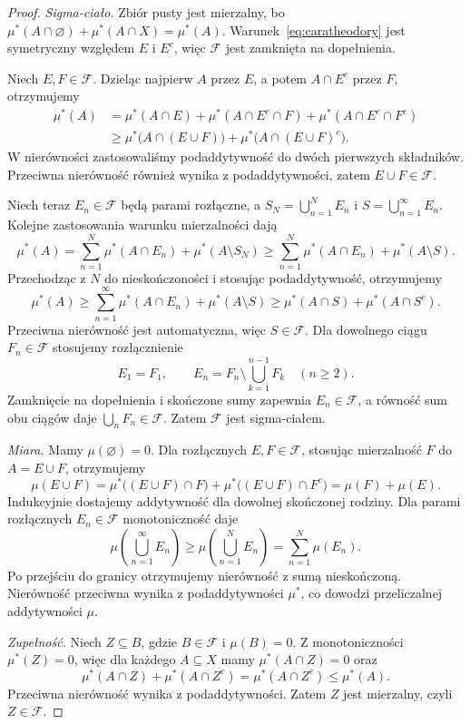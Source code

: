\begin{proof}
\emph{Sigma-ciało.}
Zbiór pusty jest mierzalny, bo
$\mu^{\ast}(A\cap\varnothing)+\mu^{\ast}(A\cap X)=\mu^{\ast}(A)$.
Warunek~\eqref{eq:caratheodory} jest symetryczny względem $E$ i $E^c$,
więc $\mathcal{F}$ jest zamknięta na dopełnienia.

Niech $E,F\in\mathcal{F}$. Dzieląc najpierw $A$ przez $E$, a potem
$A\cap E^c$ przez $F$, otrzymujemy
\begin{align*}
  \mu^{\ast}(A)
    &=\mu^{\ast}(A\cap E)+\mu^{\ast}(A\cap E^c\cap F)
      +\mu^{\ast}(A\cap E^c\cap F^c)\\
    &\geq\mu^{\ast}\bigl(A\cap(E\cup F)\bigr)
      +\mu^{\ast}\bigl(A\cap(E\cup F)^c\bigr).
\end{align*}
W nierówności zastosowaliśmy podaddytywność do dwóch pierwszych
składników. Przeciwna nierówność również wynika z podaddytywności,
zatem $E\cup F\in\mathcal{F}$.

Niech teraz $E_n\in\mathcal{F}$ będą parami rozłączne, a
$S_N=\bigcup_{n=1}^{N}E_n$ i $S=\bigcup_{n=1}^{\infty}E_n$.
Kolejne zastosowania warunku mierzalności dają
\[
  \mu^{\ast}(A)
  =\sum_{n=1}^{N}\mu^{\ast}(A\cap E_n)+\mu^{\ast}(A\setminus S_N)
  \geq\sum_{n=1}^{N}\mu^{\ast}(A\cap E_n)
      +\mu^{\ast}(A\setminus S).
\]
Przechodząc z $N$ do nieskończoności i stosując podaddytywność,
otrzymujemy
\[
  \mu^{\ast}(A)
  \geq\sum_{n=1}^{\infty}\mu^{\ast}(A\cap E_n)
       +\mu^{\ast}(A\setminus S)
  \geq\mu^{\ast}(A\cap S)+\mu^{\ast}(A\cap S^c).
\]
Przeciwna nierówność jest automatyczna, więc $S\in\mathcal{F}$.
Dla dowolnego ciągu $F_n\in\mathcal{F}$ stosujemy rozłącznienie
\[
  E_1=F_1,\qquad
  E_n=F_n\setminus\bigcup_{k=1}^{n-1}F_k\quad(n\geq2).
\]
Zamknięcie na dopełnienia i skończone sumy zapewnia $E_n\in\mathcal{F}$,
a równość sum obu ciągów daje $\bigcup_nF_n\in\mathcal{F}$.
Zatem $\mathcal{F}$ jest sigma-ciałem.

\emph{Miara.}
Mamy $\mu(\varnothing)=0$.
Dla rozłącznych $E,F\in\mathcal{F}$, stosując mierzalność $F$ do
$A=E\cup F$, otrzymujemy
\[
  \mu(E\cup F)
  =\mu^{\ast}\bigl((E\cup F)\cap F\bigr)
   +\mu^{\ast}\bigl((E\cup F)\cap F^c\bigr)
  =\mu(F)+\mu(E).
\]
Indukcyjnie dostajemy addytywność dla dowolnej skończonej rodziny.
Dla parami rozłącznych $E_n\in\mathcal{F}$ monotoniczność daje
\[
  \mu\left(\bigcup_{n=1}^{\infty}E_n\right)
  \geq\mu\left(\bigcup_{n=1}^{N}E_n\right)
  =\sum_{n=1}^{N}\mu(E_n).
\]
Po przejściu do granicy otrzymujemy nierówność z sumą nieskończoną.
Nierówność przeciwna wynika z podaddytywności $\mu^{\ast}$,
co dowodzi przeliczalnej addytywności $\mu$.

\emph{Zupełność.}
Niech $Z\subseteq B$, gdzie $B\in\mathcal{F}$ i $\mu(B)=0$.
Z monotoniczności $\mu^{\ast}(Z)=0$, więc dla każdego $A\subseteq X$
mamy $\mu^{\ast}(A\cap Z)=0$ oraz
\[
  \mu^{\ast}(A\cap Z)+\mu^{\ast}(A\cap Z^c)
  =\mu^{\ast}(A\cap Z^c)\leq\mu^{\ast}(A).
\]
Przeciwna nierówność wynika z podaddytywności.
Zatem $Z$ jest mierzalny, czyli $Z\in\mathcal{F}$.
\end{proof}

